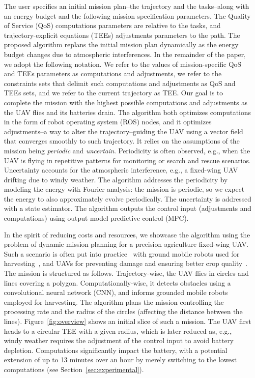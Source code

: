 \documentclass[letterpaper,10pt,conference]{ieeeconf}
\theoremstyle{definition}
\begin{document}
The user specifies an initial mission plan--the trajectory and the tasks--along with an energy budget and the following mission specification parameters. The Quality of Service (QoS) computations parameters are relative to the tasks, and trajectory-explicit equations (TEEs) adjustments parameters to the path. The proposed algorithm replans the initial mission plan dynamically as the energy budget changes due to atmospheric interferences. In the remainder of the paper, we adopt the following notation. We refer to the values of mission-specific QoS and TEEs parameters as computations and adjustments, we refer to the constraints sets that delimit such computations and adjustments as QoS and TEEs sets, and we refer to the current trajectory as TEE. Our goal is to complete the mission with the highest possible computations and adjustments as the UAV flies and its batteries drain. The algorithm both optimizes computations in the form of robot operating system (ROS) nodes, and it optimizes adjustments--a way to alter the trajectory--guiding the UAV using a vector field~\cite{de2017guidance} that converges smoothly to such trajectory. It relies on the assumptions of the mission being \emph{periodic} and \emph{uncertain}. Periodicity is often observed, e.g., when the UAV is flying in repetitive patterns for monitoring or search and rescue scenarios. Uncertainty accounts for the atmospheric interference, e.g., a fixed-wing UAV drifting due to windy weather. The algorithm addresses the periodicity by modeling the energy with Fourier analysis: the mission is periodic, so we expect the energy to also approximately evolve periodically. The uncertainty is addressed with a state estimator. The algorithm outputs the control input (adjustments and computations) using output model predictive control (MPC).

In the spirit of reducing costs and resources, we showcase the algorithm using the problem of dynamic mission planning for a precision agriculture fixed-wing UAV. Such a scenario is often put into practice~\cite{hajjaj2014review} with ground mobile robots used for harvesting~\cite{qingchun2012study,dong2011development, de2011design, aljanobi2010setup, li2008analysis, edan2000robotic}, and UAVs for preventing damage and ensuring better crop quality~\cite{puri2017agriculture, daponte2019review}. The mission is structured as follows. Trajectory-wise, the UAV flies in circles and lines covering a polygon. Computationally-wise, it detects obstacles using a convolutional neural network (CNN), and informs grounded mobile robots employed for harvesting. The algorithm plans the mission controlling the processing rate and the radius of the circles (affecting the distance between the lines). Figure~\ref{fig:overview} shows an initial slice of such a mission. The UAV first heads to a circular TEE with a given radius, which is later reduced as, e.g., windy weather requires the adjustment of the control input to avoid battery depletion. Computations significantly impact the battery, with a potential extension of up to 13 minutes over an hour by merely switching to the lowest computations (see Section~\ref{sec:experimental}).
\end{document}
